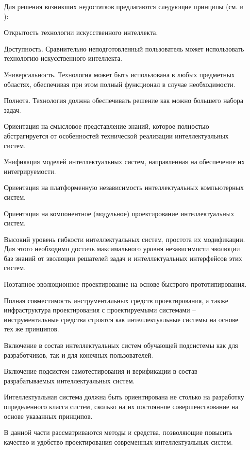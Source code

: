 \begin{partbacktext}
Для решения возникших недостатков предлагаются следующие принципы (см.  и ):
\begin{textitemize}
	\item{Открытость технологии искусственного интеллекта.}
	\item{Доступность. Сравнительно неподготовленный пользователь может использовать технологию искусственного интеллекта.}
	\item{Универсальность. Технология может быть использована в любых предметных областях, обеспечивая при этом полный функционал в случае необходимости.}
	\item{Полнота. Технология должна обеспечивать решение как можно большего набора задач.}
	\item{Ориентация на смысловое представление знаний, которое полностью абстрагируется от
		особенностей технической реализации интеллектуальных систем.}
	\item{Унификация моделей интеллектуальных систем, направленная на обеспечение их интегрируемости.}
	\item{Ориентация на платформенную независимость интеллектуальных компьютерных систем.}
	\item{Ориентация на компонентное (модульное) проектирование интеллектуальных систем.}
	\item{Высокий уровень гибкости интеллектуальных систем, простота их модификации. Для этого необходимо достичь максимального уровня независимости эволюции баз знаний от эволюции решателей задач и интеллектуальных интерфейсов этих систем.}
	\item{Поэтапное эволюционное проектирование на основе быстрого прототипирования.}
	\item{Полная совместимость инструментальных средств проектирования, а также инфраструктура проектирования с проектируемыми системами – инструментальные средства строятся как интеллектуальные системы на основе тех же принципов.}
	\item{Включение в состав интеллектуальных систем обучающей подсистемы как для разработчиков, так и для конечных пользователей.}
	\item{Включение подсистем самотестирования и верификации в состав разрабатываемых интеллектуальных систем.}
\end{textitemize}

Интеллектуальная система должна быть ориентирована не столько на разработку определенного класса систем, сколько на их постоянное совершенствование  на основе указанных принципов.

В данной части рассматриваются методы и средства, позволяющие повысить качество и удобство проектирования современных интеллектуальных систем.
\end{partbacktext}




